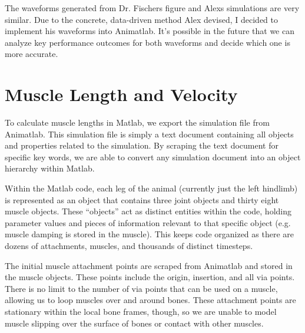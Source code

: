 \documentclass[runningheads,a4paper]{llncs}
\begin{document}
	The waveforms generated from Dr. Fischer\textquotesingle s figure and Alex\textquotesingle s simulations are very similar. Due to the concrete, data-driven method Alex devised, I decided to implement his waveforms into Animatlab. It’s possible in the future that we can analyze key performance outcomes for both waveforms and decide which one is more accurate. \par
	
	\section{Muscle Length and Velocity}
	To calculate muscle lengths in Matlab, we export the simulation file from Animatlab. This simulation file is simply a text document containing all objects and properties related to the simulation. By scraping the text document for specific key words, we are able to convert any simulation document into an object hierarchy within Matlab. \par
	Within the Matlab code, each leg of the animal (currently just the left hindlimb) is represented as an object that contains three joint objects and thirty eight muscle objects. These “objects” act as distinct entities within the code, holding parameter values and pieces of information relevant to that specific object (e.g. muscle damping is stored in the muscle). This keeps code organized as there are dozens of attachments, muscles, and thousands of distinct timesteps. \par
	The initial muscle attachment points are scraped from Animatlab and stored in the muscle objects. These points include the origin, insertion, and all via points. There is no limit to the number of via points that can be used on a muscle, allowing us to loop muscles over and around bones. These attachment points are stationary within the local bone frames, though, so we are unable to model muscle slipping over the surface of bones or contact with other muscles. \par
\end{document}
